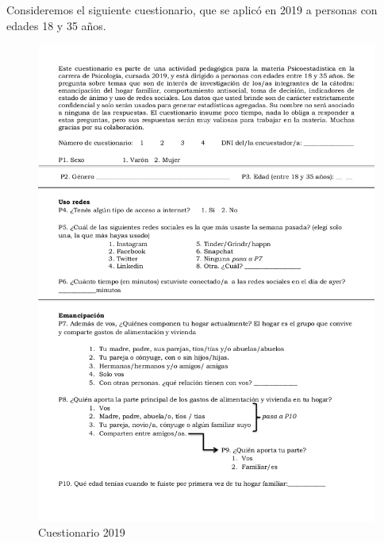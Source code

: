 \documentclass[]{book}
\begin{document}
Consideremos el siguiente cuestionario, que se aplicó en 2019 a personas con edades 18 y 35 años.

\begin{figure}

{\centering \includegraphics{imagenes/cuestionario2019_01} 

}

\caption{Cuestionario 2019}\label{fig:cuestionario}
\end{figure}
\end{document}
